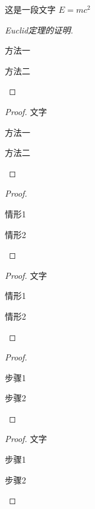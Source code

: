 \documentclass{xdyy-usermanual}
\begin{document}
\begin{vexample}
    \begin{analysis}
      这是一段文字 $E = m c^2$
    \end{analysis}
    
    \begin{proof}[Euclid定理的证明]
      \begin{method}
        \item 方法一
        \item 方法二
      \end{method}
    \end{proof}
    
    \begin{proof}
      文字
      \begin{method}
        \item 方法一
        \item 方法二
      \end{method}
    \end{proof}
\end{vexample}


\begin{vexample}
    \begin{proof}
      \begin{case}
        \item 情形1
        \item 情形2
      \end{case}
    \end{proof}
    
    \begin{proof}
      文字
      \begin{case}
        \item 情形1
        \item 情形2
      \end{case}
    \end{proof}
\end{vexample}

\begin{vexample}
    \begin{proof}
      \begin{step}
        \item 步骤1
        \item 步骤2
      \end{step}
    \end{proof}
    
    \begin{proof}
      文字
      \begin{step}
        \item 步骤1
        \item 步骤2
      \end{step}
    \end{proof}
\end{vexample}
\end{document}
